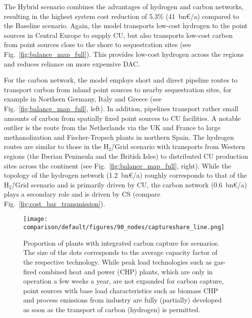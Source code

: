 \documentclass[twocolumn]{article}
\newcommand{\baselinescenario}{Baseline scenario}
\newcommand{\hydrogenscenario}{H$_2$\=/Grid scenario}
\newcommand{\hybridscenario}{Hybrid scenario}
\begin{document}
The \hybridscenario{} combines the advantages of hydrogen and carbon networks, resulting in the highest system cost reduction of 5.3\% (41~bn€/a) compared to the \baselinescenario{}. Again, the model transports low-cost hydrogen to the point sources in Central Europe to supply CU, but also transports low-cost carbon from point sources close to the shore to sequestration sites (see Fig.~\ref{fig:balance_map_full}). This provides low-cost hydrogen across the regions and reduces reliance on more expensive DAC.


For the carbon network, the model employs short and direct pipeline routes to transport carbon from inland point sources to nearby sequestration sites, for example in Northern Germany, Italy and Greece (see Fig.~\ref{fig:balance_map_full}, left). In addition, pipelines transport rather small amounts of carbon from spatially fixed point sources to CU facilities. A notable outlier is the route from the Netherlands via the UK and France to large methanolization and Fischer-Tropsch plants in northern Spain.
The hydrogen routes are similar to those in the \hydrogenscenario{} with transports from Western regions (the Iberian Peninsula and the British Isles) to distributed CU production sites across the continent (see Fig.~\ref{fig:balance_map_full}, right).
While the topology of the hydrogen network (1.2~bn€/a) roughly corresponds to that of the \hydrogenscenario{} and is primarily driven by CU, the carbon network (0.6~bn€/a) plays a secondary role and is driven by CS (compare Fig.~\ref{fig:cost_bar_transmission}).


\begin{figure}[ht]
    \centering
    \texttt{[image: comparison/default/figures/90\_nodes/captureshare\_line.png]}
    \caption{Proportion of plants with integrated carbon capture for scenarios. The size of the dots corresponds to the average capacity factor of the respective technology. While peak load technologies such as gas-fired combined heat and power (CHP) plants, which are only in operation a few weeks a year, are not expanded for carbon capture, point sources with base load characteristics such as biomass CHP and process emissions from industry are fully (partially) developed as soon as the transport of carbon (hydrogen) is permitted.}
    \label{fig:captureshare_line}
\end{figure}%
\end{document}
